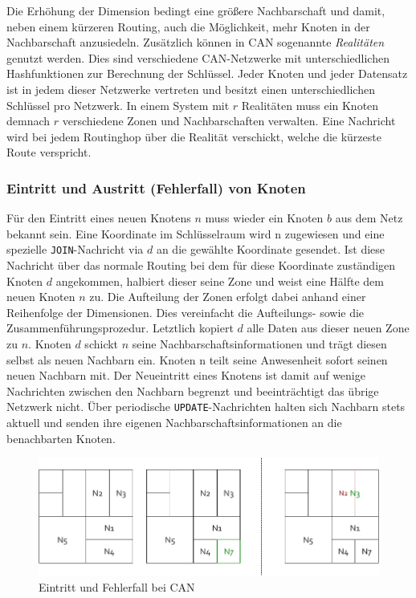 Die Erhöhung der Dimension bedingt eine größere Nachbarschaft und damit, neben einem kürzeren Routing, auch die Möglichkeit, mehr Knoten in der Nachbarschaft anzusiedeln. Zusätzlich können in CAN sogenannte \emph{Realitäten} genutzt werden. Dies sind verschiedene CAN-Netzwerke mit unterschiedlichen Hashfunktionen zur Berechnung der Schlüssel. Jeder Knoten und jeder Datensatz ist in jedem dieser Netzwerke vertreten und besitzt einen unterschiedlichen Schlüssel pro Netzwerk. In einem System mit $r$ Realitäten muss ein Knoten demnach $r$ verschiedene Zonen und Nachbarschaften verwalten. Eine Nachricht wird bei jedem Routinghop über die Realität verschickt, welche die kürzeste Route verspricht.

\subsubsection{Eintritt und Austritt (Fehlerfall) von Knoten}
Für den Eintritt eines neuen Knotens $n$ muss wieder ein Knoten $b$ aus dem Netz bekannt sein. Eine Koordinate im Schlüsselraum wird n zugewiesen und eine spezielle \texttt{JOIN}-Nachricht via $d$ an die gewählte Koordinate gesendet. Ist diese Nachricht über das normale Routing bei dem für diese Koordinate zuständigen Knoten $d$ angekommen, halbiert dieser seine Zone und weist eine Hälfte dem neuen Knoten $n$ zu. Die Aufteilung der Zonen erfolgt dabei anhand einer Reihenfolge der Dimensionen. Dies vereinfacht die Aufteilungs- sowie die Zusammenführungsprozedur. Letztlich kopiert $d$ alle Daten aus dieser neuen Zone zu $n$. Knoten $d$ schickt $n$ seine Nachbarschaftsinformationen und trägt diesen selbst als neuen Nachbarn ein. Knoten n teilt seine Anwesenheit sofort seinen neuen Nachbarn mit. Der Neueintritt eines Knotens ist damit auf wenige Nachrichten zwischen den Nachbarn begrenzt und beeinträchtigt das übrige Netzwerk nicht. Über periodische \texttt{UPDATE}-Nachrichten halten sich Nachbarn stets aktuell und senden ihre eigenen Nachbarschaftsinformationen an die benachbarten Knoten.

\begin{figure}[htbp]
\centering
\includegraphics{grafics/can_new_node.pdf}
\caption{Eintritt und Fehlerfall bei CAN}
\label{fig:can_new_node}
\end{figure}

